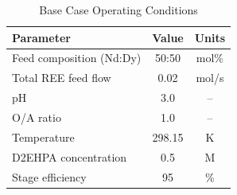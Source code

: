 \begin{table}[htbp]
\centering
\caption{Base Case Operating Conditions}
\label{tab:base-conditions}
\begin{tabular}{lcc}
\toprule
Parameter & Value & Units \\
\midrule
Feed composition (Nd:Dy) & 50:50 & mol\% \\
Total REE feed flow & 0.02 & mol/s \\
pH & 3.0 & -- \\
O/A ratio & 1.0 & -- \\
Temperature & 298.15 & K \\
D2EHPA concentration & 0.5 & M \\
Stage efficiency & 95 & \% \\
\bottomrule
\end{tabular}
\end{table}
